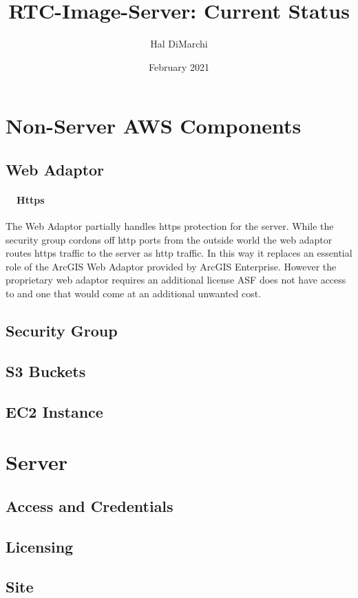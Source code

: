 \documentclass[11pt,legalpaper]{article}
\begin{document}
    \title{RTC-Image-Server: Current Status}
    \author{Hal DiMarchi}
    \date{February 2021}
    \maketitle
    \newpage
    \tableofcontents
    \newpage
    \section{Non-Server AWS Components}
      \subsection{Web Adaptor}
        \begin{addmargin}[1em]{2em}
        \paragraph{~~Https \newline}
          The Web Adaptor partially handles https protection for the server. While the security group cordons off http ports from the outside world the web adaptor routes https traffic to the server as http traffic. In this way it replaces an essential role of the ArcGIS Web Adaptor provided by ArcGIS Enterprise. However the proprietary web adaptor requires an additional license ASF does not have access to and one that would come at an additional unwanted cost.
        \end{addmargin}
      \subsection{Security Group}
      \subsection{S3 Buckets}
      \subsection{EC2 Instance}
    \section{Server}
      \subsection{Access and Credentials}
      \subsection{Licensing}
      \subsection{Site}
\end{document}
